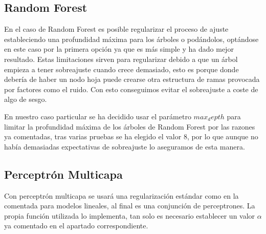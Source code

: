 \documentclass{article}
\begin{document}
	\subsection{Random Forest}
	En el caso de Random Forest es posible regularizar el proceso de ajuste estableciendo una profundidad máxima para los árboles o podándolos, optándose en este caso por la primera opción ya que es más simple y ha dado mejor resultado. Estas limitaciones sirven para regularizar debido a que un árbol empieza a tener sobreajuste cuando crece demasiado, esto es porque donde debería de haber un nodo hoja puede crearse otra estructura de ramas provocada por factores como el ruido. Con esto conseguimos evitar el sobreajuste a coste de algo de sesgo.
	\par
	En nuestro caso particular se ha decidido usar el parámetro $max_depth$ para limitar la profundidad máxima de los árboles de Random Forest por las razones ya comentadas, tras varias pruebas se ha elegido el valor 8, por lo que aunque no había demasiadas expectativas de sobreajuste lo aseguramos de esta manera.
	\subsection{Perceptrón Multicapa}
	Con perceptrón multicapa se usará una regularización estándar como en la comentada para modelos lineales, al final es una conjunción de perceptrones. La propia función utilizada lo implementa, tan solo es necesario establecer un valor $\alpha$ ya comentado en el apartado correspondiente.
	
\end{document}
